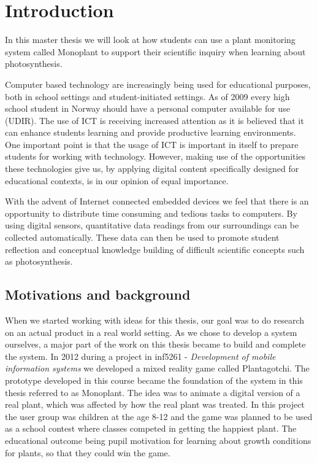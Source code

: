 \chapter{Introduction}
In this master thesis we will look at how students can use a plant monitoring system called Monoplant to support their scientific inquiry when learning about photosynthesis. 

Computer based technology are increasingly being used for educational purposes, both in school settings and student-initiated settings. As of 2009 every high school student in Norway should have a personal computer available for use (UDIR). The use of ICT is receiving increased attention as it is believed that it can enhance students learning and provide productive learning environments. One important point is that the usage of ICT is important in itself to prepare students for working with technology. However, making use of the opportunities these technologies give us, by applying digital content specifically designed for educational contexts, is in our opinion of equal importance. 

With the advent of Internet connected embedded devices we feel that there is an opportunity to  distribute time consuming and tedious tasks to computers. By using digital sensors, quantitative data readings from our surroundings can be collected automatically. These data can then be used to promote student reflection and conceptual knowledge building of difficult scientific concepts such as photosynthesis. 

\section{Motivations and background}
When we started working with ideas for this thesis, our goal was to do research on an actual product in a real world setting. As we chose to develop a system ourselves, a major part of the work on this thesis became to build and complete the system. In 2012 during a project in inf5261 - \emph{Development of mobile information systems} we developed a mixed reality game called Plantagotchi. The prototype developed in this course became the foundation of the system in this thesis referred to as Monoplant. The idea was to animate a digital version of a real plant, which was affected by how the real plant was treated. In this project the user group was children at the age 8-12 and the game was planned to be used as a school contest where classes competed in getting the happiest plant. The educational outcome being pupil motivation for learning about growth conditions for plants, so that they could win the game. 

